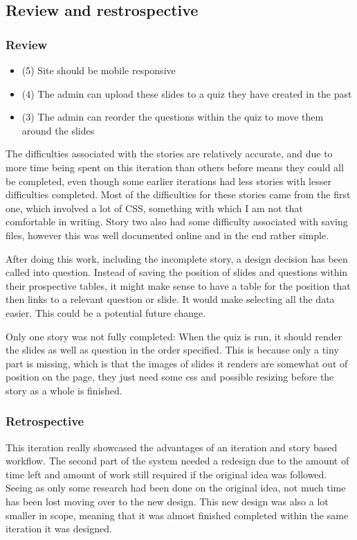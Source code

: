 \subsection{Review and restrospective}
\subsubsection{Review}
\begin{itemize}
	\item (5) Site should be mobile responsive
	\item (4) The admin can upload these slides to a quiz they have created in the past
	\item (3) The admin can reorder the questions within the quiz to move them around the slides
\end{itemize}
The difficulties associated with the stories are relatively accurate, and due to more time being spent on this iteration than others before means they could all be completed, even though some earlier iterations had less stories with lesser difficulties completed. Most of the difficulties for these stories came from the first one, which involved a lot of CSS, something with which I am not that comfortable in writing. Story two also had some difficulty associated with saving files, however this was well documented online and in the end rather simple.

After doing this work, including the incomplete story, a design decision has been called into question. Instead of saving the position of slides and questions within their prospective tables, it might make sense to have a table for the position that then links to a relevant question or slide. It would make selecting all the data easier. This could be a potential future change.

Only one story was not fully completed: When the quiz is run, it should render the slides as well as question in the order specified. This is because only a tiny part is missing, which is that the images of slides it renders are somewhat out of position on the page, they just need some css and possible resizing before the story as a whole is finished.

\subsubsection{Retrospective}
This iteration really showcased the advantages of an iteration and story based workflow. The second part of the system needed a redesign due to the amount of time left and amount of work still required if the original idea was followed. Seeing as only some research had been done on the original idea, not much time has been lost moving over to the new design. This new design was also a lot smaller in scope, meaning that it was almost finished completed within the same iteration it was designed.

